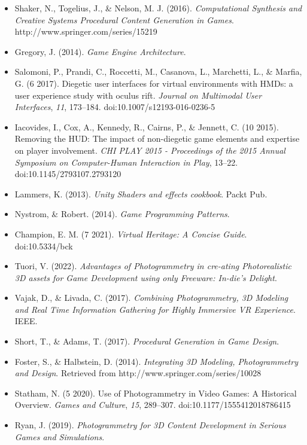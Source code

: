 \begin{itemize}
    \item Shaker, N., Togelius, J., \& Nelson, M. J. (2016). \textit{Computational Synthesis and Creative Systems Procedural Content Generation in Games}. http://www.springer.com/series/15219

    \item Gregory, J. (2014). \textit{Game Engine Architecture}.

    \item Salomoni, P., Prandi, C., Roccetti, M., Casanova, L., Marchetti, L., \& Marfia, G. (6 2017). Diegetic user interfaces for virtual environments with HMDs: a user experience study with oculus rift. \textit{Journal on Multimodal User Interfaces}, \textit{11}, 173–184. doi:10.1007/s12193-016-0236-5

    \item Iacovides, I., Cox, A., Kennedy, R., Cairns, P., \& Jennett, C. (10 2015). Removing the HUD: The impact of non-diegetic game elements and expertise on player involvement. \textit{CHI PLAY 2015 - Proceedings of the 2015 Annual Symposium on Computer-Human Interaction in Play}, 13–22. doi:10.1145/2793107.2793120

    \item Lammers, K. (2013). \textit{Unity Shaders and effects cookbook}. Packt Pub.

    \item Nystrom, \& Robert. (2014). \textit{Game Programming Patterns}.

    \item Champion, E. M. (7 2021). \textit{Virtual Heritage: A Concise Guide}. doi:10.5334/bck

    \item Tuori, V. (2022). \textit{Advantages of Photogrammetry in cre-ating Photorealistic 3D assets for Game Development using only Freeware: In-die’s Delight}.

    \item Vajak, D., \& Livada, C. (2017). \textit{Combining Photogrammetry, 3D Modeling and Real Time Information Gathering for Highly Immersive VR Experience}. IEEE.

    \item Short, T., \& Adams, T. (2017). \textit{Procedural Generation in Game Design}.

    \item Foster, S., \& Halbstein, D. (2014). \textit{Integrating 3D Modeling, Photogrammetry and Design}. Retrieved from http://www.springer.com/series/10028

    \item Statham, N. (5 2020). Use of Photogrammetry in Video Games: A Historical Overview. \textit{Games and Culture}, \textit{15}, 289–307. doi:10.1177/1555412018786415

    \item Ryan, J. (2019). \textit{Photogrammetry for 3D Content Development in Serious Games and Simulations}.
\end{itemize}

 


